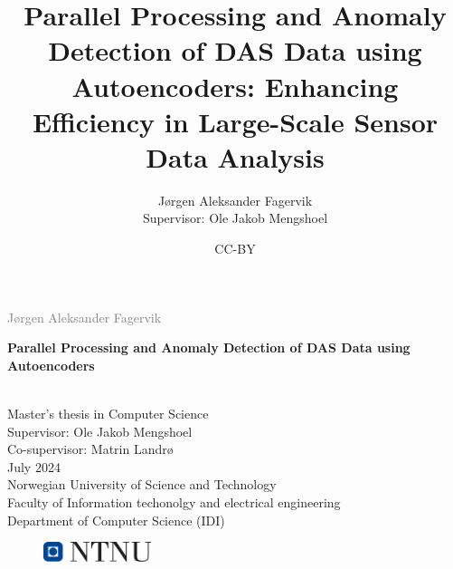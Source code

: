 \documentclass[british]{ntnuthesis}
\title{Parallel Processing and Anomaly Detection of DAS Data using Autoencoders: Enhancing Efficiency in Large-Scale Sensor Data Analysis}
\author{Jørgen Aleksander Fagervik \\
        Supervisor: Ole Jakob Mengshoel}
\date{CC-BY \ntnuthesisdate}
\begin{document}
\begin{titlepage}
\vspace*{1.5cm}

\noindent  \textcolor{gray}{\large Jørgen Aleksander Fagervik} \\
\vspace{1cm}

\noindent \textbf{\Large Parallel Processing and Anomaly Detection of DAS Data using Autoencoders } \\
\vspace{0.5cm}

 \\



\vspace{7cm}
\noindent Master's thesis in Computer Science \\
Supervisor: Ole Jakob Mengshoel \\
Co-supervisor: Matrin Landrø \\
July 2024 \\

\vspace{0.2cm}
\noindent Norwegian University of Science and Technology \\
Faculty of Information techonolgy and electrical engineering \\
Department of Computer Science (IDI) \\

\begin{figure}[h]
    \includegraphics[width=0.28\textwidth]{figures/ntnu_basic.png}
\end{figure}
\end{titlepage}
\restoregeometry
\myemptypage 





\tableofcontents
\listoffigures
\listoftables
\lstlistoflistings

\printglossary[type=\acronymtype] %
\printglossary                    %









\chapter*{\bibname}
\printbibliography[heading=none]

\appendix








\end{document}
